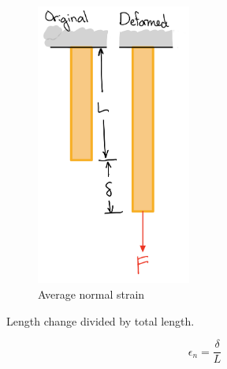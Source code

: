 \begin{figure}[!h]
\centering
\includegraphics[angle=0, width=2in]{Strain-Figures/Avg Normal Strain.png}
\vspace{-2mm}
\caption{\small Average normal strain}
\vspace{-3mm}
\label{Fig:Avg Normal Strain}
\end{figure}

\noindent Length change divided by total length.

\[ \epsilon_n = \frac{\delta}{L}\]

